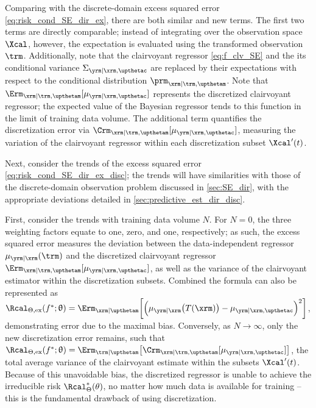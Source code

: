 \documentclass[12pt]{report}
\begin{document}
Comparing with the discrete-domain excess squared error \eqref{eq:risk_cond_SE_dir_ex}, there are both similar and new terms. The first two terms are directly comparable; instead of integrating over the observation space $\Xcal$, however, the expectation is evaluated using the transformed observation $\trm$. Additionally, note that the clairvoyant regressor \eqref{eq:f_clv_SE} and the its conditional variance $\Sigma_{\yrm | \xrm,\upthetac}$ are replaced by their expectations with respect to the conditional distribution $\prm_{\xrm | \trm, \upthetam}$. Note that $\Erm_{\xrm | \trm, \upthetam}[\mu_{\yrm | \xrm,\upthetac}]$ represents the discretized clairvoyant regressor; the expected value of the Bayesian regressor tends to this function in the limit of training data volume. The additional term quantifies the discretization error via $\Crm_{\xrm | \trm, \upthetam}[\mu_{\yrm | \xrm,\upthetac}]$, measuring the variation of the clairvoyant regressor within each discretization subset $\Xcal'(t)$. 

Next, consider the trends of the excess squared error \eqref{eq:risk_cond_SE_dir_ex_disc}; the trends will have similarities with those of the discrete-domain observation problem discussed in \cref{sec:SE_dir}, with the appropriate deviations detailed in \cref{sec:predictive_est_dir_disc}.

First, consider the trends with training data volume $N$. For $N = 0$, the three weighting factors equate to one, zero, and one, respectively; as such, the excess squared error measures the deviation between the data-independent regressor $\mu_{\yrm|\xrm}(\trm)$ and the discretized clairvoyant regressor $\Erm_{\xrm | \trm, \upthetam}[\mu_{\yrm | \xrm,\upthetac}]$, as well as the variance of the clairvoyant estimator within the discretization subsets. Combined the formula can also be represented as $\Rcal_{\Theta, \mathrm{ex}}(f^* ; \uptheta) = \Erm_{\xrm | \upthetam}\bigg[ \Big( \mu_{\yrm | \xrm}\big(T(\xrm)\big) - \mu_{\yrm | \xrm,\upthetac} \Big)^2 \bigg]$, demonstrating error due to the maximal bias. Conversely, as $N \to \infty$, only the new discretization error remains, such that $\Rcal_{\Theta, \mathrm{ex}}(f^* ; \uptheta) = \Erm_{\trm | \upthetam}\big[ \Crm_{\xrm | \trm, \upthetam}[\mu_{\yrm | \xrm,\upthetac}] \big]$, the total average variance of the clairvoyant estimate within the subsets $\Xcal'(t)$. Because of this unavoidable bias, the discretized regressor is unable to achieve the irreducible risk $\Rcal_{\Theta}^*(\theta)$, no matter how much data is available for training -- this is the fundamental drawback of using discretization.
\end{document}
